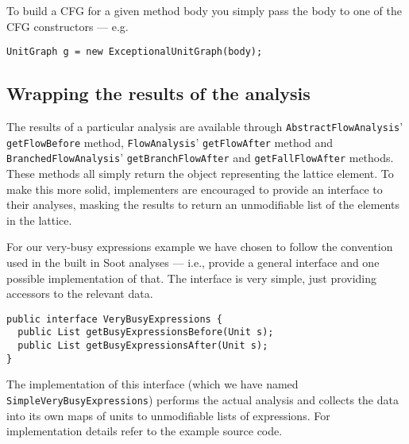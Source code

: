 \documentclass{article}
\newcommand{\code}[1]{\texttt{\small #1}}
\begin{document}
To build a CFG for a given method body you simply pass the body to one
of the CFG constructors --- e.g.
\begin{center}
  \begin{minipage}{0.9 \linewidth}
    \begin{verbatim}
UnitGraph g = new ExceptionalUnitGraph(body);
    \end{verbatim}
  \end{minipage}
\end{center}

\subsection{Wrapping the results of the analysis}

The results of a particular analysis are available through
\code{AbstractFlowAnalysis}' \code{getFlowBefore} method,
\code{FlowAnalysis}' \code{getFlowAfter} method and
\code{Branched\-Flow\-Analysis}' \code{getBranchFlowAfter} and
\code{getFallFlowAfter} methods. These methods all simply return the
object representing the lattice element. To make this more solid,
implementers are encouraged to provide an interface to their analyses,
masking the results to return an unmodifiable list of the elements in
the lattice.

For our very-busy expressions example we have chosen to follow the
convention used in the built in Soot analyses --- i.e., provide a
general interface and one possible implementation of that. The
interface is very simple, just providing accessors to the relevant
data.
\begin{center}
  \begin{minipage}{0.9 \linewidth}
    \begin{verbatim}
public interface VeryBusyExpressions {
  public List getBusyExpressionsBefore(Unit s);
  public List getBusyExpressionsAfter(Unit s);
}
    \end{verbatim}
  \end{minipage}
\end{center}
The implementation of this interface (which we have named
\code{SimpleVeryBusy\-Expressions}) performs the actual analysis and
collects the data into its own maps of units to unmodifiable lists of
expressions. For implementation details refer to the example source
code.
\end{document}
